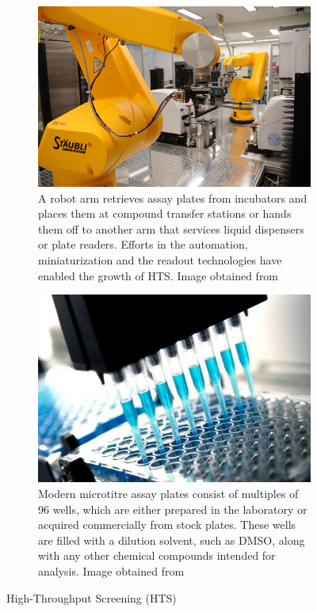 \begin{figure}[htbp]
    \centering
    \begin{subfigure}[b]{0.48\textwidth}
        \centering
        \includegraphics[width=\textwidth]{figures/hts_robot.png}
        \caption{A robot arm retrieves assay plates from incubators and places them at compound transfer stations or hands them off to another arm that services liquid dispensers or plate readers. Efforts in the automation, miniaturization and the readout technologies have enabled the growth of HTS. Image obtained from~\cite{hts_robot}}
        \label{fig:hts_robot}
    \end{subfigure}
    \hfill
    \begin{subfigure}[b]{0.48\textwidth}
        \centering
        \includegraphics[width=\textwidth]{figures/hts.png}
        \caption{Modern microtitre assay plates consist of multiples of 96 wells, which are either prepared in the laboratory or acquired commercially from stock plates. These wells are filled with a dilution solvent, such as DMSO, along with any other chemical compounds intended for analysis. Image obtained from~\cite{hts_plates}}
        \label{fig:hts_plates}
    \end{subfigure}
    \caption{High-Throughput Screening (HTS)}
    \label{fig:hts}
\end{figure}


